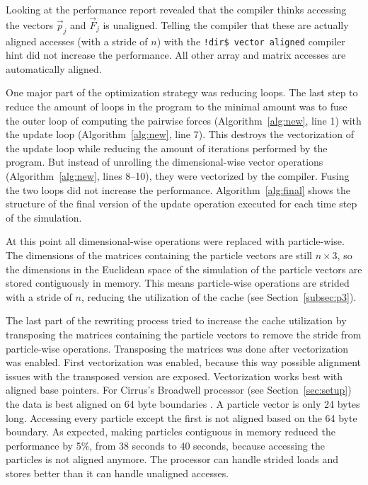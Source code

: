 \documentclass[twoside,11pt]{article}
\begin{document}
Looking at the performance report revealed that the compiler thinks
accessing the vectors $\vec{p}_j$ and $\vec{F}_j$ is unaligned.
Telling the compiler that these are actually aligned accesses (with a
stride of $n$) with the \texttt{!dir\$ vector aligned} compiler hint
did not increase the performance.
All other array and matrix accesses are automatically aligned.

One major part of the optimization strategy was reducing loops.
The last step to reduce the amount of loops in the program to the
minimal amount was to fuse the outer loop of computing the
pairwise forces (Algorithm~\ref{alg:new}, line 1) with the update loop
(Algorithm~\ref{alg:new}, line 7).
This destroys the vectorization of the update loop while reducing the
amount of iterations performed by the program.
But instead of unrolling the dimensional-wise vector operations
(Algorithm~\ref{alg:new}, lines 8--10), they were vectorized by the
compiler.
Fusing the two loops did not increase the performance.
Algorithm~\ref{alg:final} shows the structure of the final version of
the update operation executed for each time step of the simulation.

At this point all dimensional-wise operations were replaced with
particle-wise.
The dimensions of the matrices containing the particle vectors are
still $n \times 3$, so the dimensions in the Euclidean space of the
simulation of the particle vectors are stored contiguously in memory.
This means particle-wise operations are strided with a stride of $n$,
reducing the utilization of the cache (see Section~\ref{subsec:p3}).

The last part of the rewriting process tried to increase the cache
utilization by transposing the matrices containing the particle
vectors to remove the stride from particle-wise operations.
Transposing the matrices was done after vectorization was enabled.
First vectorization was enabled, because this way possible
alignment issues with the transposed version are exposed.
Vectorization works best with aligned base pointers.
For Cirrus's Broadwell processor (see Section~\ref{sec:setup}) the
data is best aligned on 64 byte boundaries \citep{krishnaiyer2015}.
A particle vector is only 24 bytes long.
Accessing every particle except the first is not aligned based on the
64 byte boundary.
As expected, making particles contiguous in memory reduced the
performance by 5\%, from 38 seconds to 40 seconds, because accessing
the particles is not aligned anymore.
The processor can handle strided loads and stores better than it can
handle unaligned accesses.
\end{document}
